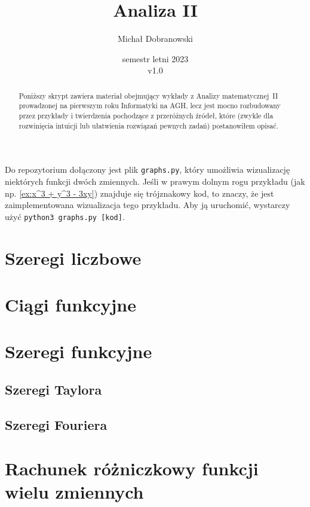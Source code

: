 \documentclass[11pt]{scrartcl}
\title{Analiza II}
\author{Michał Dobranowski}
\date{semestr letni 2023\\ v1.0}
\begin{document}
    \maketitle
    \begin{abstract}
        \noindent Poniższy skrypt zawiera materiał obejmujący wykłady z Analizy matematycznej~II prowadzonej na pierwszym roku Informatyki na AGH, lecz jest mocno rozbudowany przez przykłady i twierdzenia pochodzące z przeróżnych źródeł, które (zwykle dla rozwinięcia intuicji lub ułatwienia rozwiązań pewnych zadań) postanowiłem opisać.
    \end{abstract}
    \tableofcontents
    \newpage

    Do repozytorium dołączony jest plik \texttt{graphs.py}, który umożliwia wizualizację niektórych funkcji dwóch zmiennych. Jeśli w prawym dolnym rogu przykładu (jak np. \ref{ex:x^3 + y^3 - 3xy}) znajduje się trójznakowy kod, to znaczy, że jest zaimplementowana wizualizacja tego przykładu. Aby ją uruchomić, wystarczy użyć \texttt{python3 graphs.py [kod]}.

    \section{Szeregi liczbowe}
    

    \section{Ciągi funkcyjne}
    

    \section{Szeregi funkcyjne}
    
        \subsection{Szeregi Taylora}
        
        \subsection{Szeregi Fouriera}
        

    \section{Rachunek różniczkowy funkcji wielu zmiennych}
    
\end{document}
